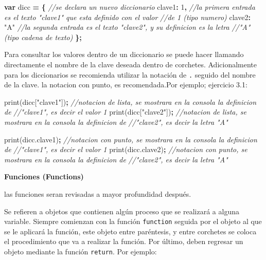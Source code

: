 \documentclass[
]{article}
\newenvironment{Shaded}{\begin{snugshade}}{\end{snugshade}}
\newcommand{\AttributeTok}[1]{\textcolor[rgb]{0.77,0.63,0.00}{#1}}
\newcommand{\CommentTok}[1]{\textcolor[rgb]{0.56,0.35,0.01}{\textit{#1}}}
\newcommand{\DataTypeTok}[1]{\textcolor[rgb]{0.13,0.29,0.53}{#1}}
\newcommand{\DecValTok}[1]{\textcolor[rgb]{0.00,0.00,0.81}{#1}}
\newcommand{\KeywordTok}[1]{\textcolor[rgb]{0.13,0.29,0.53}{\textbf{#1}}}
\newcommand{\NormalTok}[1]{#1}
\newcommand{\OperatorTok}[1]{\textcolor[rgb]{0.81,0.36,0.00}{\textbf{#1}}}
\newcommand{\StringTok}[1]{\textcolor[rgb]{0.31,0.60,0.02}{#1}}
\newcommand{\VariableTok}[1]{\textcolor[rgb]{0.00,0.00,0.00}{#1}}
\begin{document}
\begin{Shaded}
\begin{Highlighting}[]
\KeywordTok{var}\NormalTok{ dicc }\OperatorTok{=} \OperatorTok{\{}    \CommentTok{//se declara un nuevo diccionario}
  \DataTypeTok{clave1}\OperatorTok{:} \DecValTok{1}\OperatorTok{,}    \CommentTok{//la primera entrada es el texto "clave1" que esta definido con el valor}
  \CommentTok{//de 1 (tipo numero)  }
  \DataTypeTok{clave2}\OperatorTok{:} \StringTok{"A"}   \CommentTok{//la segunda entrada es el texto "clave2", y su definicion es la letra}
  \CommentTok{//"A" (tipo cadena de texto)}
\OperatorTok{\};}            
\end{Highlighting}
\end{Shaded}

Para consultar los valores dentro de un diccionario se puede hacer
llamando directamente el nombre de la clave deseada dentro de corchetes.
Adicionalmente para los diccionarios se recomienda utilizar la notación
de \texttt{.} seguido del nombre de la clave. la notacion con punto, es
recomendada.Por ejemplo; ejercicio 3.1:

\begin{Shaded}
\begin{Highlighting}[]
\AttributeTok{print}\NormalTok{(dicc[}\StringTok{"clave1"}\NormalTok{])}\OperatorTok{;}  \CommentTok{//notacion de lista, se mostrara en la consola la definicion de }
\CommentTok{//"clave1", es decir el valor 1 }
\AttributeTok{print}\NormalTok{(dicc[}\StringTok{"clave2"}\NormalTok{])}\OperatorTok{;}  \CommentTok{//notacion de lista, se mostrara en la consola la definicion de }
\CommentTok{//"clave2", es decir la letra "A"}

\AttributeTok{print}\NormalTok{(}\VariableTok{dicc}\NormalTok{.}\AttributeTok{clave1}\NormalTok{)}\OperatorTok{;}  \CommentTok{//notacion con punto, se mostrara en la consola la definicion de }
\CommentTok{//"clave1", es decir el valor 1 }
\AttributeTok{print}\NormalTok{(}\VariableTok{dicc}\NormalTok{.}\AttributeTok{clave2}\NormalTok{)}\OperatorTok{;}  \CommentTok{//notacion con punto, se mostrara en la consola la definicion de }
\CommentTok{//"clave2", es decir la letra "A"}
\end{Highlighting}
\end{Shaded}

\textbf{Funciones (Functions)}

las funciones seran revisadas a mayor profundidad después.

Se refieren a objetos que contienen algún proceso que se realizará a
alguna variable. Siempre comienzan con la función \texttt{function}
seguida por el objeto al que se le aplicará la función, este objeto
entre paréntesis, y entre corchetes se coloca el procedimiento que va a
realizar la función. Por último, deben regresar un objeto mediante la
función \texttt{return}. Por ejemplo:
\end{document}
